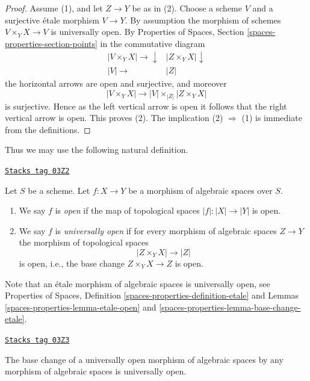 \begin{proof}
Assume (1), and let $Z \to Y$ be as in (2). Choose a scheme $V$ and
a surjective \'etale morphism $V \to Y$. By assumption the morphism
of schemes $V \times_Y X \to V$ is universally open. By
Properties of Spaces, Section \ref{spaces-properties-section-points}
in the commutative diagram
$$
\begin{array}{cc}|V \times_Y X| \longrightarrow\downarrow & |Z \times_Y X| \downarrow \\ |V| \longrightarrow & |Z|\end{array}
$$
the horizontal arrows are open and surjective, and moreover
$$
|V \times_Y X| \longrightarrow |V| \times_{|Z|} |Z \times_Y X|
$$
is surjective. Hence as the left
vertical arrow is open it follows that the right vertical arrow is
open. This proves (2). The implication (2) $\Rightarrow$ (1) is
immediate from the definitions.
\end{proof}

Thus we may use the following natural definition.

\begin{definition}[Open]
\label{spaces-morphisms-definition-open}
\href{https://stacks.math.columbia.edu/tag/03Z2}{\texttt{Stacks tag 03Z2}}

Let $S$ be a scheme. Let $f : X \to Y$ be a morphism of algebraic spaces
over $S$.
\begin{enumerate}
\item We say $f$ is {\it open} if the map of topological spaces
$|f| : |X| \to |Y|$ is open.
\item We say $f$ is {\it universally open} if for every morphism
of algebraic spaces $Z \to Y$ the morphism of topological spaces
$$
|Z \times_Y X| \to |Z|
$$
is open, i.e., the base change $Z \times_Y X \to Z$ is open.
\end{enumerate}
\end{definition}

Note that an \'etale morphism of algebraic spaces is universally open,
see
Properties of Spaces, Definition \ref{spaces-properties-definition-etale} and
Lemmas \ref{spaces-properties-lemma-etale-open} and
\ref{spaces-properties-lemma-base-change-etale}.

\begin{lemma}
\label{spaces-morphisms-lemma-base-change-universally-open}
\href{https://stacks.math.columbia.edu/tag/03Z3}{\texttt{Stacks tag 03Z3}}

The base change of a universally open morphism of algebraic spaces
by any morphism of algebraic spaces is universally open.
\end{lemma}

